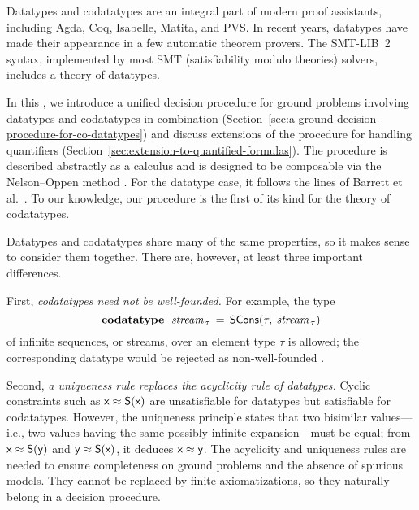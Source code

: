 \nopagebreak

Datatypes and codatatypes are an integral part of modern proof assistants,
including Agda, Coq, Isabelle, Matita, and PVS. In recent years, datatypes
have made their appearance in a few automatic theorem provers. The SMT-LIB~2
\cite{barrett-et-al-2010} syntax, implemented by most SMT (satisfiability
modulo theories) solvers, includes a theory of datatypes.

\pagebreak

In this \thewordpaper, we introduce a unified decision procedure for ground
problems involving datatypes and codatatypes in combination
(Section~\ref{sec:a-ground-decision-procedure-for-co-datatypes})
and discuss extensions  of the procedure for handling quantifiers
(Section~\ref{sec:extension-to-quantified-formulas}).
The procedure is described abstractly as a calculus and is
designed to be composable via the Nelson--Oppen method \cite{nelson-oppen-1979}.
For the datatype case, it follows the lines of Barrett et al.\ \cite{barrett-et-al-2007}.
To our knowledge, our procedure is the first of its kind for the theory of
codatatypes.

Datatypes and codatatypes share many of the same properties, so it makes sense
to consider them together. There are, however, at least three important
differences.

First, \emph{codatatypes need not be well-founded.}
For example, the type
%
\[\textbf{codatatype}~\;\textit{stream}_{\,\tau} \,=\, \textsf{SCons}(\tau,\: \textit{stream}_{\,\tau})\]
%
of infinite sequences, or streams, over an element type $\tau$ is allowed; the
corresponding datatype would be rejected as non-well-founded \cite{blanchette-et-al-2015-esop}.

Second, \emph{a uniqueness rule replaces the acyclicity rule of datatypes.}
Cyclic constraints such as
$\textsf{x} \approx \textsf{S}(\textsf{x})$ %
are unsatisfiable for datatypes but satisfiable for codatatypes.
However, the uniqueness principle states that two bisimilar values---i.e., two values
having the same possibly infinite expansion---must be equal; from $\textsf{x}
\approx \textsf{S}(\textsf{y})$ and
$\textsf{y} \approx \textsf{S}(\textsf{x})$, it deduces $\textsf{x} \approx \textsf{y}$.
The acyclicity and uniqueness rules are needed to ensure completeness on
ground problems and the absence of spurious models. They cannot be replaced by
finite axiomatizations, so they naturally belong in a decision procedure.

